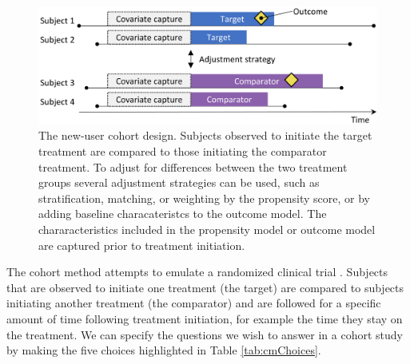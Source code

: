\documentclass[11pt]{book}
\begin{document}
\begin{figure}

{\centering \includegraphics[width=0.9\linewidth]{images/PopulationLevelEstimation/cohortMethod} 

}

\caption{The new-user cohort design. Subjects observed to initiate the target treatment are compared to those initiating the comparator treatment. To adjust for differences between the two treatment groups several adjustment strategies can be used, such as stratification, matching, or weighting by the propensity score, or by adding baseline characateristcs to the outcome model. The chararacteristics included in the propensity model or outcome model are captured prior to treatment initiation.}\label{fig:cohortMethod}
\end{figure}

The cohort method attempts to emulate a randomized clinical trial
\citep{hernan_2016}. Subjects that are observed to initiate one
treatment (the target) are compared to subjects initiating another
treatment (the comparator) and are followed for a specific amount of
time following treatment initiation, for example the time they stay on
the treatment. We can specify the questions we wish to answer in a
cohort study by making the five choices highlighted in Table
\ref{tab:cmChoices}.
\end{document}
